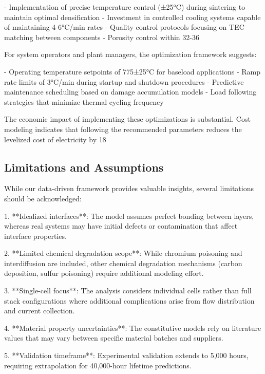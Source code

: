 \documentclass[conference]{IEEEtran}
\begin{document}
- Implementation of precise temperature control (±25°C) during sintering to maintain optimal densification
- Investment in controlled cooling systems capable of maintaining 4-6°C/min rates
- Quality control protocols focusing on TEC matching between components
- Porosity control within 32-36%

For system operators and plant managers, the optimization framework suggests:

- Operating temperature setpoints of 775±25°C for baseload applications
- Ramp rate limits of 3°C/min during startup and shutdown procedures
- Predictive maintenance scheduling based on damage accumulation models
- Load following strategies that minimize thermal cycling frequency

The economic impact of implementing these optimizations is substantial. Cost modeling indicates that following the recommended parameters reduces the levelized cost of electricity by 18%

\subsection{Limitations and Assumptions}

While our data-driven framework provides valuable insights, several limitations should be acknowledged:

1. **Idealized interfaces**: The model assumes perfect bonding between layers, whereas real systems may have initial defects or contamination that affect interface properties.

2. **Limited chemical degradation scope**: While chromium poisoning and interdiffusion are included, other chemical degradation mechanisms (carbon deposition, sulfur poisoning) require additional modeling effort.

3. **Single-cell focus**: The analysis considers individual cells rather than full stack configurations where additional complications arise from flow distribution and current collection.

4. **Material property uncertainties**: The constitutive models rely on literature values that may vary between specific material batches and suppliers.

5. **Validation timeframe**: Experimental validation extends to 5,000 hours, requiring extrapolation for 40,000-hour lifetime predictions.
\end{document}
